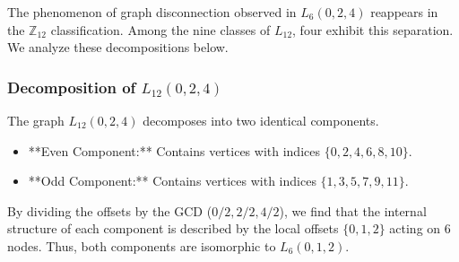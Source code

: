 \documentclass[12pt,letterpaper]{amsart}
\begin{document}
The phenomenon of graph disconnection observed in $L_6(0,2,4)$ reappears in the $\mathbb{Z}_{12}$ classification.
Among the nine classes of $L_{12}$, four exhibit this separation. We analyze these decompositions below.

\subsubsection*{Decomposition of $L_{12}(0,2,4)$}
The graph $L_{12}(0,2,4)$ decomposes into two identical components. 

\begin{itemize}
    \item **Even Component:** Contains vertices with indices $\{0, 2, 4, 6, 8, 10\}$.
    \item **Odd Component:** Contains vertices with indices $\{1, 3, 5, 7, 9, 11\}$.
\end{itemize}

By dividing the offsets by the GCD ($0/2, 2/2, 4/2$), we find that the internal structure of each component is described by the local offsets $\{0, 1, 2\}$ acting on 6 nodes. Thus, both components are isomorphic to $L_6(0,1,2)$.
\end{document}
